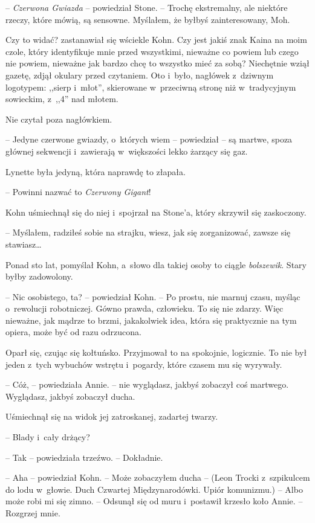 \documentclass[oneside,polish,11pt,sfheadings]{mwbk}
\begin{document}
-- \emph{Czerwona Gwiazda} -- powiedział Stone. -- Trochę ekstremalny, ale
niektóre rzeczy, które mówią, są sensowne. Myślałem, że byłbyś
zainteresowany, Moh.

Czy to widać? zastanawiał się wściekle Kohn. Czy jest jakiś znak Kaina
na moim czole, który identyfikuje mnie przed wszystkimi, nieważne co
powiem lub czego nie powiem, nieważne jak bardzo chcę to wszystko mieć
za sobą? Niechętnie wziął gazetę, zdjął okulary przed czytaniem. Oto i~było, nagłówek z~dziwnym logotypem: ,,sierp i~młot'', skierowane w~przeciwną stronę niż w~tradycyjnym sowieckim, z~,,4'' nad młotem.

Nie czytał poza nagłówkiem.

-- Jedyne czerwone gwiazdy, o~których wiem -- powiedział -- są martwe,
spoza głównej sekwencji i~zawierają w~większości lekko żarzący się gaz.

Lynette była jedyną, która naprawdę to złapała.

-- Powinni nazwać to \emph{Czerwony Gigant}!

Kohn uśmiechnął się do niej i~spojrzał na Stone'a, który skrzywił się
zaskoczony.

-- Myślałem, radziłeś sobie na strajku, wiesz, jak się zorganizować,
zawsze się stawiasz\ldots

Ponad sto lat, pomyślał Kohn, a~słowo dla takiej osoby to ciągle
\emph{bolszewik}. Stary byłby zadowolony.

-- Nic osobistego, ta? -- powiedział Kohn. -- Po prostu, nie marnuj czasu,
myśląc o~rewolucji robotniczej. Gówno prawda, człowieku. To się nie
zdarzy. Więc nieważne, jak mądrze to brzmi, jakakolwiek idea, która się
praktycznie na tym opiera, może być od razu odrzucona.

Oparł się, czując się kołtuńsko. Przyjmował to na spokojnie, logicznie.
To nie był jeden z~tych wybuchów wstrętu i~pogardy, które czasem mu się
wyrywały.

-- Cóż, -- powiedziała Annie. -- nie wyglądasz, jakbyś zobaczył coś
martwego. Wyglądasz, jakbyś zobaczył ducha.

Uśmiechnął się na widok jej zatroskanej, zadartej twarzy.

-- Blady i~cały drżący?

-- Tak -- powiedziała trzeźwo. -- Dokładnie.

-- Aha -- powiedział Kohn. -- Może zobaczyłem ducha -- (Leon Trocki z~szpikulcem do lodu w~głowie. Duch Czwartej Międzynarodówki. Upiór
komunizmu.) -- Albo może robi mi się zimno. -- Odsunął się od muru i~postawił krzesło koło Annie. -- Rozgrzej mnie.
\end{document}
